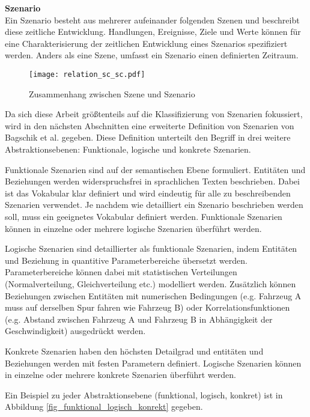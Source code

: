\noindent\textbf{Szenario}\\
Ein Szenario besteht aus mehrerer aufeinander folgenden Szenen und beschreibt diese zeitliche Entwicklung. Handlungen, Ereignisse, Ziele und Werte können für eine Charakterisierung der zeitlichen Entwicklung eines Szenarios spezifiziert werden. Anders als eine Szene, umfasst ein Szenario einen definierten Zeitraum.

\begin{figure}[h]
\centering
\texttt{[image: relation\_sc\_sc.pdf]}
\caption{Zusammenhang zwischen Szene und Szenario \cite{ulbrich2015defining}}
\label{fig_relation_sc_sc}
\end{figure}

Da sich diese Arbeit größtenteils auf die Klassifizierung von Szenarien fokussiert, wird in den nächsten Abschnitten eine erweiterte Definition von Szenarien von Bagschik et al. \cite{bagschik2017szenarien} gegeben. Diese Definition unterteilt den Begriff in drei weitere Abstraktionsebenen: Funktionale, logische und konkrete Szenarien.

Funktionale Szenarien sind auf der semantischen Ebene formuliert. Entitäten und Beziehungen werden widerspruchsfrei in sprachlichen Texten beschrieben. Dabei ist das Vokabular klar definiert und wird eindeutig für alle zu beschreibenden Szenarien verwendet. Je nachdem wie detailliert ein Szenario beschrieben werden soll, muss ein geeignetes Vokabular definiert werden. Funktionale Szenarien können in einzelne oder mehrere logische Szenarien überführt werden.

Logische Szenarien sind detaillierter als funktionale Szenarien, indem  Entitäten und Beziehung in quantitive Parameterbereiche übersetzt werden. Parameterbereiche können dabei mit statistischen Verteilungen (Normalverteilung, Gleichverteilung etc.) modelliert werden. Zusätzlich können Beziehungen zwischen Entitäten mit numerischen Bedingungen (e.g. Fahrzeug A muss auf derselben Spur fahren wie Fahrzeug B) oder Korrelationsfunktionen (e.g. Abstand zwischen Fahrzeug A und Fahrzeug B in Abhängigkeit der Geschwindigkeit) ausgedrückt werden.

Konkrete Szenarien haben den höchsten Detailgrad und entitäten und Beziehungen werden mit festen Parametern definiert. Logische Szenarien können in einzelne oder mehrere konkrete Szenarien überführt werden.

Ein Beispiel zu jeder Abstraktionsebene (funktional, logisch, konkret) ist in Abbildung \ref{fig_funktional_logisch_konrekt} gegeben.

